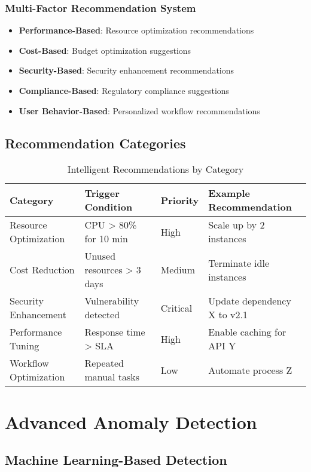 \subsubsection{Multi-Factor Recommendation System}

\begin{itemize}
    \item \textbf{Performance-Based}: Resource optimization recommendations
    \item \textbf{Cost-Based}: Budget optimization suggestions
    \item \textbf{Security-Based}: Security enhancement recommendations
    \item \textbf{Compliance-Based}: Regulatory compliance suggestions
    \item \textbf{User Behavior-Based}: Personalized workflow recommendations
\end{itemize}

\subsection{Recommendation Categories}

\begin{table}[H]
\centering
\caption{Intelligent Recommendations by Category}
\begin{tabular}{|p{3cm}|p{3cm}|p{2cm}|p{4cm}|}
\hline
\textbf{Category} & \textbf{Trigger Condition} & \textbf{Priority} & \textbf{Example Recommendation} \\
\hline
Resource Optimization & CPU > 80\% for 10 min & High & Scale up by 2 instances \\
\hline
Cost Reduction & Unused resources > 3 days & Medium & Terminate idle instances \\
\hline
Security Enhancement & Vulnerability detected & Critical & Update dependency X to v2.1 \\
\hline
Performance Tuning & Response time > SLA & High & Enable caching for API Y \\
\hline
Workflow Optimization & Repeated manual tasks & Low & Automate process Z \\
\hline
\end{tabular}
\end{table}

\section{Advanced Anomaly Detection}

\subsection{Machine Learning-Based Detection}

